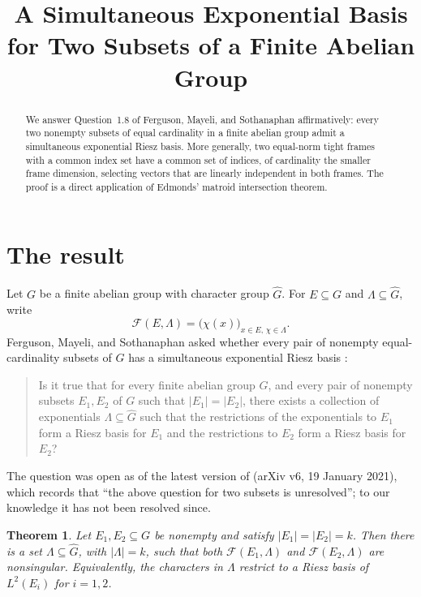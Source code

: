 \documentclass[11pt]{amsart}
\title[A simultaneous exponential basis]
{A Simultaneous Exponential Basis for Two Subsets of a Finite Abelian Group}
\date{}
\newtheorem{theorem}{Theorem}
\theoremstyle{remark}
\begin{document}
\begin{abstract}
We answer Question~1.8 of Ferguson, Mayeli, and Sothanaphan
affirmatively: every two nonempty subsets of equal cardinality in a
finite abelian group admit a simultaneous exponential Riesz basis.
More generally, two equal-norm tight frames with a common index set
have a common set of indices, of cardinality the smaller frame
dimension, selecting vectors that are linearly independent in both
frames. The proof is a direct application of Edmonds' matroid
intersection theorem.
\end{abstract}

\maketitle

\section{The result}

Let $G$ be a finite abelian group with character group $\widehat G$.
For $E\subseteq G$ and $\Lambda\subseteq\widehat G$, write
\[
  \mathcal F(E,\Lambda)
  =
  \bigl(\chi(x)\bigr)_{x\in E,\,\chi\in\Lambda}.
\]
Ferguson, Mayeli, and Sothanaphan asked whether every pair of
nonempty equal-cardinality subsets of $G$ has a simultaneous
exponential Riesz basis \cite[Question~1.8]{FMS}:
\begin{quote}
Is it true that for every finite abelian group $G$, and every pair of
nonempty subsets $E_{1}, E_{2}$ of $G$ such that $|E_{1}|=|E_{2}|$,
there exists a collection of exponentials
$\Lambda\subseteq\widehat{G}$ such that the restrictions of the
exponentials to $E_{1}$ form a Riesz basis for $E_{1}$ and the
restrictions to $E_{2}$ form a Riesz basis for $E_{2}$?
\end{quote}
The question was open as of the latest version of \cite{FMS} (arXiv
v6, 19 January 2021), which records that ``the above question for two
subsets is unresolved''; to our knowledge it has not been resolved
since.

\begin{theorem}\label{thm:main}
Let $E_1,E_2\subseteq G$ be nonempty and satisfy
$|E_1|=|E_2|=k$. Then there is a set
$\Lambda\subseteq\widehat G$, with $|\Lambda|=k$, such that both
$\mathcal F(E_1,\Lambda)$ and $\mathcal F(E_2,\Lambda)$ are
nonsingular. Equivalently, the characters in $\Lambda$ restrict to a
Riesz basis of $L^2(E_i)$ for $i=1,2$.
\end{theorem}
\end{document}
